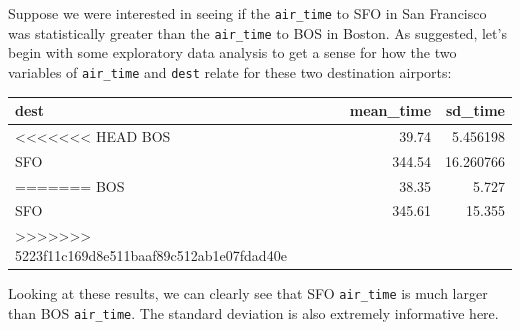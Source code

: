 \documentclass[]{tufte-book}
\newenvironment{Shaded}{\begin{snugshade}}{\end{snugshade}}
\newcommand{\KeywordTok}[1]{\textcolor[rgb]{0.13,0.29,0.53}{\textbf{{#1}}}}
\newcommand{\DataTypeTok}[1]{\textcolor[rgb]{0.13,0.29,0.53}{{#1}}}
\newcommand{\DecValTok}[1]{\textcolor[rgb]{0.00,0.00,0.81}{{#1}}}
\newcommand{\StringTok}[1]{\textcolor[rgb]{0.31,0.60,0.02}{{#1}}}
\newcommand{\NormalTok}[1]{{#1}}
\begin{document}
\begin{Shaded}
\end{Shaded}

Suppose we were interested in seeing if the \texttt{air\_time} to SFO in
San Francisco was statistically greater than the \texttt{air\_time} to
BOS in Boston. As suggested, let's begin with some exploratory data
analysis to get a sense for how the two variables of \texttt{air\_time}
and \texttt{dest} relate for these two destination airports:

\begin{Shaded}
\end{Shaded}

\begin{tabular}{l|r|r}
\hline
dest & mean\_time & sd\_time\\
\hline
<<<<<<< HEAD
BOS & 39.74 & 5.456198\\
\hline
SFO & 344.54 & 16.260766\\
=======
BOS & 38.35 & 5.727\\
\hline
SFO & 345.61 & 15.355\\
>>>>>>> 5223f11c169d8e511baaf89c512ab1e07fdad40e
\hline
\end{tabular}

Looking at these results, we can clearly see that SFO \texttt{air\_time}
is much larger than BOS \texttt{air\_time}. The standard deviation is
also extremely informative here.
\end{document}

